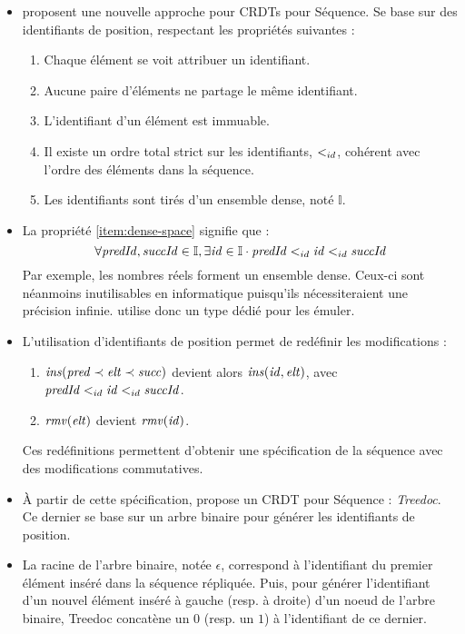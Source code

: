 \begin{itemize}
  \item \cite{2007-crdt-shapiro, 2009-treedoc-preguica} proposent une nouvelle approche pour CRDTs pour Séquence.
    Se base sur des identifiants de position, respectant les propriétés suivantes :
    \begin{enumerate}[label=(\roman*)]
      \item Chaque élément se voit attribuer un identifiant.
      \item \label{item:uniqueness} Aucune paire d'éléments ne partage le même identifiant.
      \item L'identifiant d'un élément est immuable.
      \item Il existe un ordre total strict sur les identifiants, $<_{id}$, cohérent avec l'ordre des éléments dans la séquence.
      \item \label{item:dense-space}
        Les identifiants sont tirés d'un ensemble dense, noté $\mathbb{I}$.
    \end{enumerate}
  \item La propriété \ref{item:dense-space} signifie que :
    \[\forall \mathit{predId}, \mathit{succId} \in \mathbb{I}, \exists \mathit{id} \in \mathbb{I} \cdot \mathit{predId} <_{id} \mathit{id} <_{id} \mathit{succId} \]
    Par exemple, les nombres réels forment un ensemble dense.
    Ceux-ci sont néanmoins inutilisables en informatique puisqu'ils nécessiteraient une précision infinie.
    \cite{2009-treedoc-preguica} utilise donc un type dédié pour les émuler.
  \item L'utilisation d'identifiants de position permet de redéfinir les modifications :
    \begin{enumerate}[label=(\roman*)]
      \item $\mathit{ins}(\mathit{pred} \prec \mathit{elt} \prec \mathit{succ})$ devient alors $\mathit{ins(\mathit{id}, \mathit{elt})}$, avec $\mathit{predId} <_{id} \mathit{id} <_{id} \mathit{succId}$.
      \item $\mathit{rmv}(\mathit{elt})$ devient $\mathit{rmv}(\mathit{id})$.
    \end{enumerate}
    Ces redéfinitions permettent d'obtenir une spécification de la séquence avec des modifications commutatives.
  \item À partir de cette spécification, \citeauthor{2009-treedoc-preguica} propose un CRDT pour Séquence : \emph{Treedoc}.
    Ce dernier se base sur un arbre binaire pour générer les identifiants de position.
  \item La racine de l'arbre binaire, notée $\epsilon$, correspond à l'identifiant du premier élément inséré dans la séquence répliquée.
    Puis, pour générer l'identifiant d'un nouvel élément inséré à gauche (resp. à droite) d'un noeud de l'arbre binaire, Treedoc concatène un $0$ (resp. un $1$) à l'identifiant de ce dernier.
    \begin{figure}[!ht]


\end{figure}
\end{itemize}
